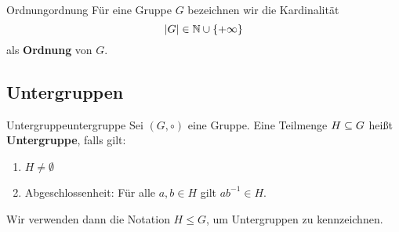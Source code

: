 \begin{definition}{Ordnung}{ordnung}
Für eine Gruppe $G$ bezeichnen wir die Kardinalität \begin{equation}
|G| \in \mathbb{N} \cup \{+\infty \}
\end{equation}
als \textbf{Ordnung} von $G$.
\end{definition}

\subsection{Untergruppen}
\label{subsec:untergruppen}
\begin{definition}{Untergruppe}{untergruppe}
Sei $(G, \circ)$ eine Gruppe. Eine Teilmenge $H \subseteq G$ heißt \textbf{Untergruppe}, falls gilt:
\begin{enumerate}[({U}1)]
\item $H \neq \emptyset$
\item Abgeschlossenheit: Für alle $a, b \in H$ gilt $ab^{-1} \in H$.
\end{enumerate}
Wir verwenden dann die Notation $H \leq G$, um Untergruppen zu kennzeichnen.
\end{definition}

